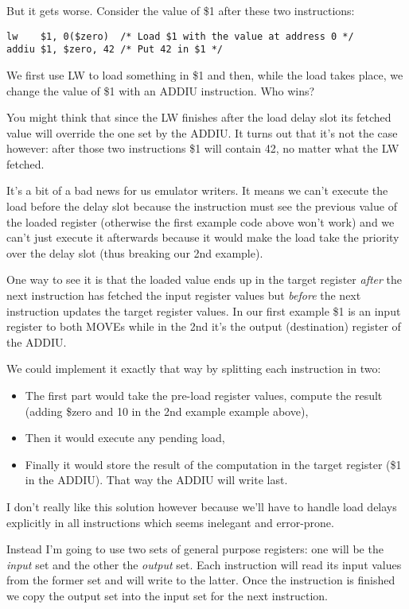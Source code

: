 \documentclass[a4paper]{article}
\begin{document}
But it gets worse. Consider the value of \$1 after these two
instructions:

\begin{lstlisting}[language=assembly]
lw    $1, 0($zero)  /* Load $1 with the value at address 0 */
addiu $1, $zero, 42 /* Put 42 in $1 */
\end{lstlisting}

We first use LW to load something in \$1 and then, while the load
takes place, we change the value of \$1 with an ADDIU instruction. Who
wins?

You might think that since the LW finishes after the load delay slot
its fetched value will override the one set by the ADDIU. It turns out
that it's not the case however: after those two instructions \$1 will
contain 42, no matter what the LW fetched.

It's a bit of a bad news for us emulator writers. It means we can't
execute the load before the delay slot because the instruction must
see the previous value of the loaded register (otherwise the first
example code above won't work) and we can't just execute it afterwards
because it would make the load take the priority over the delay slot
(thus breaking our 2nd example).

One way to see it is that the loaded value ends up in the target
register \emph{after} the next instruction has fetched the input
register values but \emph{before} the next instruction updates the
target register values. In our first example \$1 is an input register
to both MOVEs while in the 2nd it's the output (destination) register
of the ADDIU.

We could implement it exactly that way by splitting each instruction
in two:
\begin{itemize}
\item The first part would take the pre-load register values, compute
  the result (adding \$zero and 10 in the 2nd example example above),
\item Then it would execute any pending load,
\item Finally it would store the result of the computation in the
  target register (\$1 in the ADDIU). That way the ADDIU will write
  last.
\end{itemize}

I don't really like this solution however because we'll have to handle
load delays explicitly in all instructions which seems inelegant and
error-prone.

Instead I'm going to use two sets of general purpose registers: one
will be the \emph{input} set and the other the \emph{output} set. Each
instruction will read its input values from the former set and will
write to the latter. Once the instruction is finished we copy the
output set into the input set for the next instruction.
\end{document}
